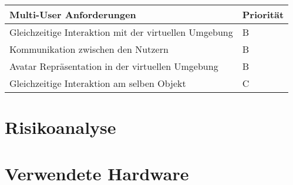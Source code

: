 \begin{center}
	\begin{tabular}	{ |l|l| }
		\hline
		\rowcolor{black}
		\color{white} \textbf{Multi-User Anforderungen} & \color{white} \textbf{Priorität} \\
		\hline
		Gleichzeitige Interaktion mit der virtuellen Umgebung & B \\
		\hline
		Kommunikation zwischen den Nutzern & B \\
		\hline
		Avatar Repräsentation in der virtuellen Umgebung & B \\
		\hline		
		Gleichzeitige Interaktion am selben Objekt & C \\
		\hline
	\end{tabular}
\end{center}
\label{tbl:multi_user_anforderungen}


\section{Risikoanalyse}

\section{Verwendete Hardware}
